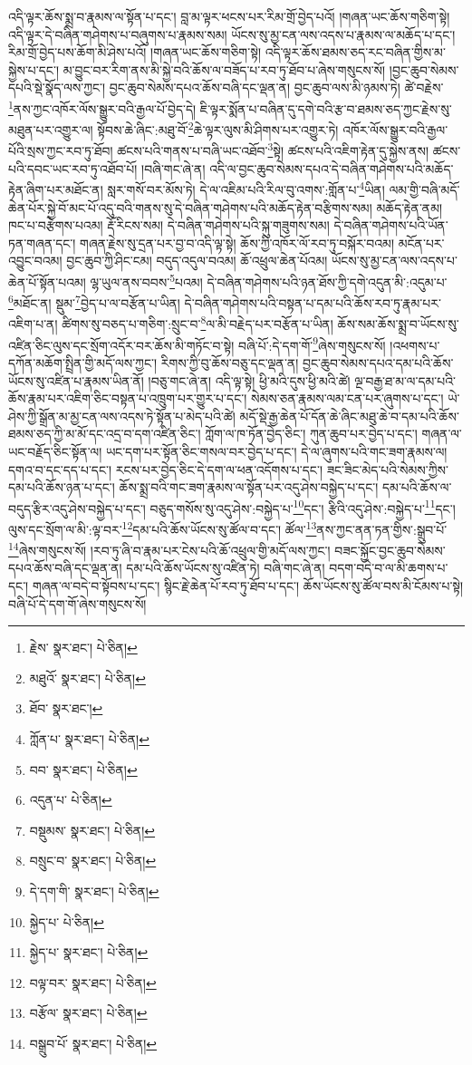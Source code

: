 འདི་ལྟར་ཆོས་སྨྲ་བ་རྣམས་ལ་སྟོན་པ་དང་། བླ་མ་ལྟར་ཕངས་པར་རིམ་གྲོ་བྱེད་པའོ། །གཞན་ཡང་ཆོས་གཅིག་སྟེ། འདི་ལྟར་དེ་བཞིན་གཤེགས་པ་བཞུགས་པ་རྣམས་སམ། ཡོངས་སུ་མྱ་ངན་ལས་འདས་པ་རྣམས་ལ་མཆོད་པ་དང་། རིམ་གྲོ་བྱེད་པས་ཆོག་མི་ཤེས་པའོ། །གཞན་ཡང་ཆོས་གཅིག་སྟེ། འདི་ལྟར་ཆོས་ཐམས་ཅད་རང་བཞིན་གྱིས་མ་སྐྱེས་པ་དང་། མ་བྱུང་བར་རིག་ནས་མི་སྐྱེ་བའི་ཆོས་ལ་བཟོད་པ་རབ་ཏུ་ཐོབ་པ་ཞེས་གསུངས་སོ། །བྱང་ཆུབ་སེམས་དཔའི་སྡེ་སྣོད་ལས་ཀྱང་། བྱང་ཆུབ་སེམས་དཔའ་ཆོས་བཞི་དང་ལྡན་ན། བྱང་ཆུབ་ལས་མི་ཉམས་ཏེ། ཚེ་བརྗེས་\footnote{རྗེས་  སྣར་ཐང་།  པེ་ཅིན། }ནས་ཀྱང་འཁོར་ལོས་སྒྱུར་བའི་རྒྱལ་པོ་བྱེད་དེ། ཇི་ལྟར་སྨོན་པ་བཞིན་དུ་དགེ་བའི་རྩ་བ་ཐམས་ཅད་ཀྱང་རྗེས་སུ་མཐུན་པར་འགྱུར་ལ། སྟོབས་ཆེ་ཞིང་:མཐུ་བོ་\footnote{མཐུའོ་  སྣར་ཐང་།  པེ་ཅིན། }ཆེ་ལྟར་ལུས་མི་ཤིགས་པར་འགྱུར་ཏེ། འཁོར་ལོས་སྒྱུར་བའི་རྒྱལ་པོའི་སྲས་ཀྱང་རབ་ཏུ་ཐོབ། ཚངས་པའི་གནས་པ་བཞི་ཡང་འཐོབ་\footnote{ཐོབ་  སྣར་ཐང་། }སྟེ། ཚངས་པའི་འཇིག་རྟེན་དུ་སྐྱེས་ནས། ཚངས་པའི་དབང་ཡང་རབ་ཏུ་འཐོབ་པོ། །བཞི་གང་ཞེ་ན། འདི་ལ་བྱང་ཆུབ་སེམས་དཔའ་དེ་བཞིན་གཤེགས་པའི་མཆོད་རྟེན་ཞིག་པར་མཐོང་ན། སླར་གསོ་བར་མོས་ཏེ། དེ་ལ་འཇིམ་པའི་རིལ་བུ་འགས་:གློན་པ་\footnote{ཀློན་པ་  སྣར་ཐང་།  པེ་ཅིན། }ཡིན། ལམ་གྱི་བཞི་མདོ་ཆེན་པོར་སྐྱེ་བོ་མང་པོ་འདུ་བའི་གནས་སུ་དེ་བཞིན་གཤེགས་པའི་མཆོད་རྟེན་བརྩིགས་སམ། མཆོད་རྟེན་ནམ། ཁང་པ་བརྩེགས་པའམ། རྡོ་རིངས་སམ། དེ་བཞིན་གཤེགས་པའི་སྐུ་གཟུགས་སམ། དེ་བཞིན་གཤེགས་པའི་ཡོན་ཏན་གཞན་དང་། གཞན་རྗེས་སུ་དྲན་པར་བྱ་བ་འདི་ལྟ་སྟེ། ཆོས་ཀྱི་འཁོར་ལོ་རབ་ཏུ་བསྐོར་བའམ། མངོན་པར་འབྱུང་བའམ། བྱང་ཆུབ་ཀྱི་ཤིང་ངམ། བདུད་འདུལ་བའམ། ཆོ་འཕྲུལ་ཆེན་པོའམ། ཡོངས་སུ་མྱ་ངན་ལས་འདས་པ་ཆེན་པོ་སྟོན་པའམ། ལྷ་ཡུལ་ནས་བབས་\footnote{བབ་  སྣར་ཐང་།  པེ་ཅིན། }པའམ། དེ་བཞིན་གཤེགས་པའི་ཉན་ཐོས་ཀྱི་དགེ་འདུན་མི་:འདུམ་པ་\footnote{འདུན་པ་  པེ་ཅིན། }མཐོང་ན། སྡུམ་\footnote{བསྡུམས་  སྣར་ཐང་།  པེ་ཅིན། }བྱེད་པ་ལ་བརྩོན་པ་ཡིན། དེ་བཞིན་གཤེགས་པའི་བསྟན་པ་དམ་པའི་ཆོས་རབ་ཏུ་རྣམ་པར་འཇིག་པ་ན། ཚིགས་སུ་བཅད་པ་གཅིག་:སྲུང་བ་\footnote{བསྲུང་བ་  སྣར་ཐང་།  པེ་ཅིན། }ལ་མི་བརྗེད་པར་བརྩོན་པ་ཡིན། ཆོས་སམ་ཆོས་སྨྲ་བ་ཡོངས་སུ་འཛིན་ཅིང་ལུས་དང་སྲོག་འདོར་བར་ཆོས་མི་གཏོང་བ་སྟེ། བཞི་པོ་:དེ་དག་གོ་\footnote{དེ་དག་གི་  སྣར་ཐང་།  པེ་ཅིན། }ཞེས་གསུངས་སོ། །འཕགས་པ་དཀོན་མཆོག་སྤྲིན་གྱི་མདོ་ལས་ཀྱང་། རིགས་ཀྱི་བུ་ཆོས་བཅུ་དང་ལྡན་ན། བྱང་ཆུབ་སེམས་དཔའ་དམ་པའི་ཆོས་ཡོངས་སུ་འཛིན་པ་རྣམས་ཡིན་ནོ། །བཅུ་གང་ཞེ་ན། འདི་ལྟ་སྟེ། ཕྱི་མའི་དུས་ཕྱི་མའི་ཚེ། ལྔ་བརྒྱ་ཐ་མ་ལ་དམ་པའི་ཆོས་རྣམ་པར་འཇིག་ཅིང་བསྟན་པ་འཁྲུག་པར་གྱུར་པ་དང་། སེམས་ཅན་རྣམས་ལམ་ངན་པར་ཞུགས་པ་དང་། ཡེ་ཤེས་ཀྱི་སྒྲོན་མ་མྱ་ངན་ལས་འདས་ཏེ་སྟོན་པ་མེད་པའི་ཚེ། མདོ་སྡེ་རྒྱ་ཆེན་པོ་དོན་ཆེ་ཞིང་མཐུ་ཆེ་བ་དམ་པའི་ཆོས་ཐམས་ཅད་ཀྱི་མ་མོ་དང་འདྲ་བ་དག་འཛིན་ཅིང་། ཀློག་ལ་ཁ་ཏོན་བྱེད་ཅིང་། ཀུན་ཆུབ་པར་བྱེད་པ་དང་། གཞན་ལ་ཡང་བརྗོད་ཅིང་སྟོན་ལ། ཡང་དག་པར་སྟོན་ཅིང་གསལ་བར་བྱེད་པ་དང་། དེ་ལ་ཞུགས་པའི་གང་ཟག་རྣམས་ལ། དགའ་བ་དང་དད་པ་དང་། རངས་པར་བྱེད་ཅིང་དེ་དག་ལ་ཕན་འདོགས་པ་དང་། ཟང་ཟིང་མེད་པའི་སེམས་ཀྱིས་དམ་པའི་ཆོས་ཉན་པ་དང་། ཆོས་སྨྲ་བའི་གང་ཟག་རྣམས་ལ་སྟོན་པར་འདུ་ཤེས་བསྐྱེད་པ་དང་། དམ་པའི་ཆོས་ལ་བདུད་རྩིར་འདུ་ཤེས་བསྐྱེད་པ་དང་། བཅུད་གསོས་སུ་འདུ་ཤེས་:བསྐྱེད་པ་\footnote{སྐྱེད་པ་  པེ་ཅིན། }དང་། རྩིའི་འདུ་ཤེས་:བསྐྱེད་པ་\footnote{སྐྱེད་པ་  སྣར་ཐང་།  པེ་ཅིན། }དང་། ལུས་དང་སྲོག་ལ་མི་:ལྟ་བར་\footnote{བལྟ་བར་  སྣར་ཐང་།  པེ་ཅིན། }དམ་པའི་ཆོས་ཡོངས་སུ་ཚོལ་བ་དང་། ཚོལ་\footnote{བརྩོལ་  སྣར་ཐང་།  པེ་ཅིན། }ནས་ཀྱང་ནན་ཏན་གྱིས་:སྒྲུབ་པོ་\footnote{བསྒྲུབ་པོ་  སྣར་ཐང་།  པེ་ཅིན། }ཞེས་གསུངས་སོ། །རབ་ཏུ་ཞི་བ་རྣམ་པར་ངེས་པའི་ཆོ་འཕྲུལ་གྱི་མདོ་ལས་ཀྱང་། བཟང་སྐྱོང་བྱང་ཆུབ་སེམས་དཔའ་ཆོས་བཞི་དང་ལྡན་ན། དམ་པའི་ཆོས་ཡོངས་སུ་འཛིན་ཏེ། བཞི་གང་ཞེ་ན། བདག་བདེ་བ་ལ་མི་ཆགས་པ་དང་། གཞན་ལ་བདེ་བ་སྟོབས་པ་དང་། སྙིང་རྗེ་ཆེན་པོ་རབ་ཏུ་ཐོབ་པ་དང་། ཆོས་ཡོངས་སུ་ཚོལ་བས་མི་ངོམས་པ་སྟེ། བཞི་པོ་དེ་དག་གོ་ཞེས་གསུངས་སོ། 